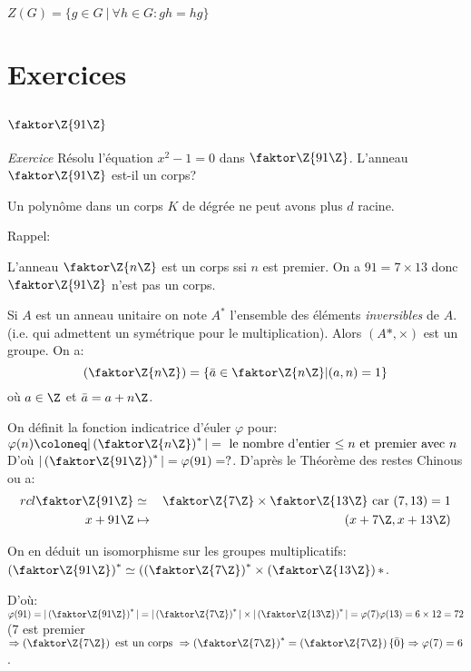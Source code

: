 \begin{rappel}
$Z(G)=\{g\in G\ | \ \forall h\in G: gh=hg\}$
\end{rappel} 



\chapter{Exercices}

\section{$\faktor\Z{91\Z}$}

\emph{Exercice}
Résolu l'équation $x^2-1=0$ dans $\faktor\Z{91\Z}$. L'anneau $\faktor\Z{91\Z}$ est-il un corps?
\begin{remark}
	Un polynôme dans un corps $K$ de dégrée ne peut avons plus $d$ racine.
\end{remark}

Rappel:

L'anneau $\faktor\Z{n\Z}$ est un corps ssi $n$ est premier. On a $91=7\times 13$ donc $\faktor\Z{91\Z}$ n'est pas un corps.

Si $A$ est un anneau unitaire on note $A^{\ast}$ l'ensemble des éléments \emph{inversibles} de $A$. (i.e. qui admettent un symétrique pour le multiplication). Alors $(A\ast,\times)$ est un groupe. On a:
$$(\faktor\Z{n\Z})=\{\bar a\in \faktor\Z{n\Z}|(a,n)=1\}$$ où $a\in\Z$ et $\bar a=a+n\Z$.

On définit la fonction indicatrice d'éuler $\varphi $ pour: $\varphi (n)\coloneq|\left(\faktor\Z{n\Z}\right)^\ast|=\mbox{ le nombre d'entier $\leq n$ et premier avec $n$}$ D'où $|\left(\faktor\Z{91\Z}\right)^\ast|=\varphi (91)=?$. D'après le Théorème des restes Chinous ou a:
\begin{align}{rcl}
	\faktor\Z{91\Z} &\simeq& \faktor\Z{7\Z}\times \faktor\Z{13\Z}\text{ car } (7,13)=1\\
	x+91\Z &\mapsto& (x+7\Z,x+13\Z)
\end{align}

On en déduit un isomorphisme sur les groupes multiplicatifs: $\left(\faktor\Z{91\Z}\right)^\ast\simeq(\left(\faktor\Z{7\Z}\right)^\ast\times \left(\faktor\Z{13\Z}\right)
\ast$. 

D'où: $\varphi (91)=|\left(\faktor\Z{91\Z}\right)^\ast |=|\left(\faktor\Z{7\Z}\right)^\ast|\times|\left(\faktor\Z{13\Z}\right)^\ast|= \varphi (7)\varphi (13)=6\times 12=72$
(7 est premier $\Rightarrow \left(\faktor\Z{7\Z}\right) \text{ est un corps } \Rightarrow \left(\faktor\Z{7\Z}\right)^\ast=\left(\faktor\Z{7\Z}\right)\\ \{\bar 0\} \Rightarrow \varphi (7)=6$.

